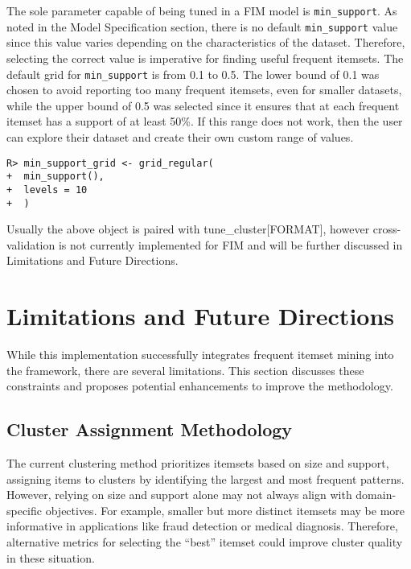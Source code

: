 \documentclass[
  article]{jss}
\begin{document}
The sole parameter capable of being tuned in a FIM model is
\texttt{min\_support}. As noted in the Model Specification section,
there is no default \texttt{min\_support} value since this value varies
depending on the characteristics of the dataset. Therefore, selecting
the correct value is imperative for finding useful frequent itemsets.
The default grid for \texttt{min\_support} is from 0.1 to 0.5. The lower
bound of 0.1 was chosen to avoid reporting too many frequent itemsets,
even for smaller datasets, while the upper bound of 0.5 was selected
since it ensures that at each frequent itemset has a support of at least
50\%. If this range does not work, then the user can explore their
dataset and create their own custom range of values.

\begin{verbatim}
R> min_support_grid <- grid_regular(
+  min_support(), 
+  levels = 10
+  )
\end{verbatim}

Usually the above object is paired with tune\_cluster{[}FORMAT{]},
however cross-validation is not currently implemented for FIM and will
be further discussed in Limitations and Future Directions.

\section{Limitations and Future Directions}\label{sec-limits}

While this implementation successfully integrates frequent itemset
mining into the  framework, there are several
limitations. This section discusses these constraints and proposes
potential enhancements to improve the methodology.

\subsection{Cluster Assignment
Methodology}\label{cluster-assignment-methodology-1}

The current clustering method prioritizes itemsets based on size and
support, assigning items to clusters by identifying the largest and most
frequent patterns. However, relying on size and support alone may not
always align with domain-specific objectives. For example, smaller but
more distinct itemsets may be more informative in applications like
fraud detection or medical diagnosis. Therefore, alternative metrics for
selecting the ``best'' itemset could improve cluster quality in these
situation.
\end{document}
